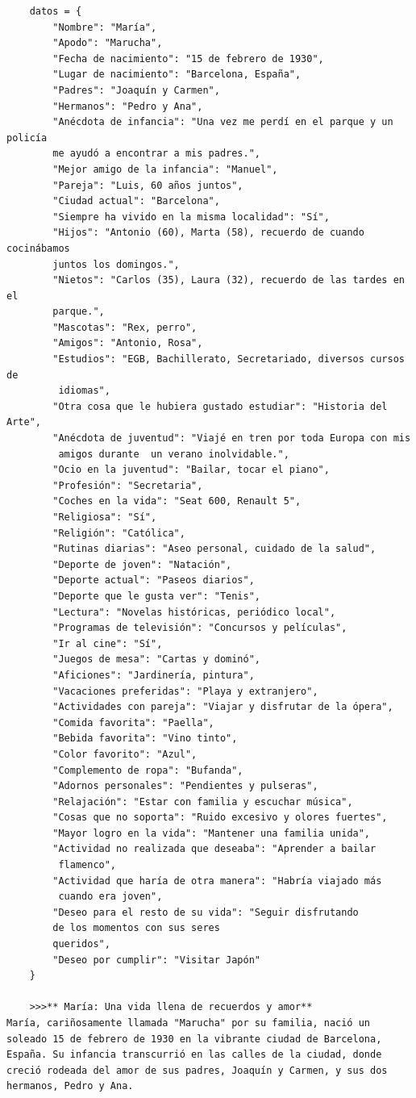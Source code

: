 \begin{verbatim}
	datos = {
		"Nombre": "María",
		"Apodo": "Marucha",
		"Fecha de nacimiento": "15 de febrero de 1930",
		"Lugar de nacimiento": "Barcelona, España",
		"Padres": "Joaquín y Carmen",
		"Hermanos": "Pedro y Ana",
		"Anécdota de infancia": "Una vez me perdí en el parque y un policía 
		me ayudó a encontrar a mis padres.",
		"Mejor amigo de la infancia": "Manuel",
		"Pareja": "Luis, 60 años juntos",
		"Ciudad actual": "Barcelona",
		"Siempre ha vivido en la misma localidad": "Sí",
		"Hijos": "Antonio (60), Marta (58), recuerdo de cuando cocinábamos 
		juntos los domingos.",
		"Nietos": "Carlos (35), Laura (32), recuerdo de las tardes en el 
		parque.",
		"Mascotas": "Rex, perro",
		"Amigos": "Antonio, Rosa",
		"Estudios": "EGB, Bachillerato, Secretariado, diversos cursos de
		 idiomas",
		"Otra cosa que le hubiera gustado estudiar": "Historia del Arte",
		"Anécdota de juventud": "Viajé en tren por toda Europa con mis
		 amigos durante  un verano inolvidable.",
		"Ocio en la juventud": "Bailar, tocar el piano",
		"Profesión": "Secretaria",
		"Coches en la vida": "Seat 600, Renault 5",
		"Religiosa": "Sí",
		"Religión": "Católica",
		"Rutinas diarias": "Aseo personal, cuidado de la salud",
		"Deporte de joven": "Natación",
		"Deporte actual": "Paseos diarios",
		"Deporte que le gusta ver": "Tenis",
		"Lectura": "Novelas históricas, periódico local",
		"Programas de televisión": "Concursos y películas",
		"Ir al cine": "Sí",
		"Juegos de mesa": "Cartas y dominó",
		"Aficiones": "Jardinería, pintura",
		"Vacaciones preferidas": "Playa y extranjero",
		"Actividades con pareja": "Viajar y disfrutar de la ópera",
		"Comida favorita": "Paella",
		"Bebida favorita": "Vino tinto",
		"Color favorito": "Azul",
		"Complemento de ropa": "Bufanda",
		"Adornos personales": "Pendientes y pulseras",
		"Relajación": "Estar con familia y escuchar música",
		"Cosas que no soporta": "Ruido excesivo y olores fuertes",
		"Mayor logro en la vida": "Mantener una familia unida",
		"Actividad no realizada que deseaba": "Aprender a bailar
		 flamenco",
		"Actividad que haría de otra manera": "Habría viajado más
		 cuando era joven",
		"Deseo para el resto de su vida": "Seguir disfrutando
		de los momentos con sus seres
		queridos",
		"Deseo por cumplir": "Visitar Japón"
	}
	
	>>>** María: Una vida llena de recuerdos y amor**
María, cariñosamente llamada "Marucha" por su familia, nació un  
soleado 15 de febrero de 1930 en la vibrante ciudad de Barcelona,  
España. Su infancia transcurrió en las calles de la ciudad, donde  
creció rodeada del amor de sus padres, Joaquín y Carmen, y sus dos  
hermanos, Pedro y Ana.  


\end{verbatim}
